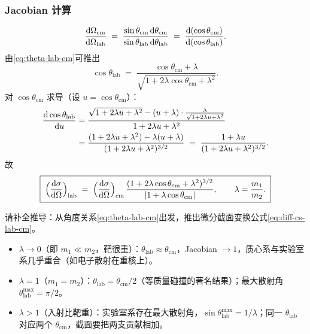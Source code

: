 \subsubsection*{Jacobian 计算}

\begin{equation}
  \frac{\mathrm{d}\Omega_{\text{cm}}}{\mathrm{d}\Omega_{\text{lab}}}
  \;=\; \frac{\sin\theta_{\text{cm}}\,\mathrm{d}\theta_{\text{cm}}}{\sin\theta_{\text{lab}}\,\mathrm{d}\theta_{\text{lab}}}
  \;=\; \frac{\mathrm{d}(\cos\theta_{\text{cm}})}{\mathrm{d}(\cos\theta_{\text{lab}})}.
\end{equation}
由\eqref{eq:theta-lab-cm}可推出
\begin{equation}
  \cos\theta_{\text{lab}} \;=\; \frac{\cos\theta_{\text{cm}}+\lambda}{\sqrt{1+2\lambda\cos\theta_{\text{cm}}+\lambda^2}}.
  \label{eq:cos-theta-lab}
\end{equation}
对 $\cos\theta_{\text{cm}}$ 求导（设 $u=\cos\theta_{\text{cm}}$）：
\begin{align}
  \frac{\mathrm{d}\cos\theta_{\text{lab}}}{\mathrm{d} u}
  &= \frac{\sqrt{1+2\lambda u+\lambda^2}-(u+\lambda)\cdot\frac{\lambda}{\sqrt{1+2\lambda u+\lambda^2}}}{1+2\lambda u+\lambda^2} \notag\\
  &= \frac{(1+2\lambda u+\lambda^2)-\lambda(u+\lambda)}{(1+2\lambda u+\lambda^2)^{3/2}}
  \;=\; \frac{1+\lambda u}{(1+2\lambda u+\lambda^2)^{3/2}}.
\end{align}
故
\begin{equation}
  \boxed{\;
  \Big(\frac{\mathrm{d}\sigma}{\mathrm{d}\Omega}\Big)_{\text{lab}}
  \;=\; \Big(\frac{\mathrm{d}\sigma}{\mathrm{d}\Omega}\Big)_{\text{cm}}\,
        \frac{(1+2\lambda\cos\theta_{\text{cm}}+\lambda^2)^{3/2}}{|1+\lambda\cos\theta_{\text{cm}}|},
        \qquad \lambda=\frac{m_1}{m_2}.
  \;}
  \label{eq:diff-cs-lab-cm}
\end{equation}

\begin{remark}[作业 3-3]
  请补全推导：从角度关系\eqref{eq:theta-lab-cm}出发，推出微分截面变换公式\eqref{eq:diff-cs-lab-cm}。
\end{remark}

\begin{remark}[特殊情形]
  \begin{itemize}
    \item $\lambda\to 0$（即 $m_1\ll m_2$，靶很重）：$\theta_{\text{lab}}\approx\theta_{\text{cm}}$，Jacobian $\to 1$，质心系与实验室系几乎重合（如电子散射在重核上）。
    \item $\lambda=1$（$m_1=m_2$）：$\theta_{\text{lab}}=\theta_{\text{cm}}/2$（等质量碰撞的著名结果）；最大散射角 $\theta_{\text{lab}}^{\max}=\pi/2$。
    \item $\lambda>1$（入射比靶重）：实验室系存在最大散射角，$\sin\theta_{\text{lab}}^{\max}=1/\lambda$；同一 $\theta_{\text{lab}}$ 对应两个 $\theta_{\text{cm}}$，截面要把两支贡献相加。
  \end{itemize}
\end{remark}

